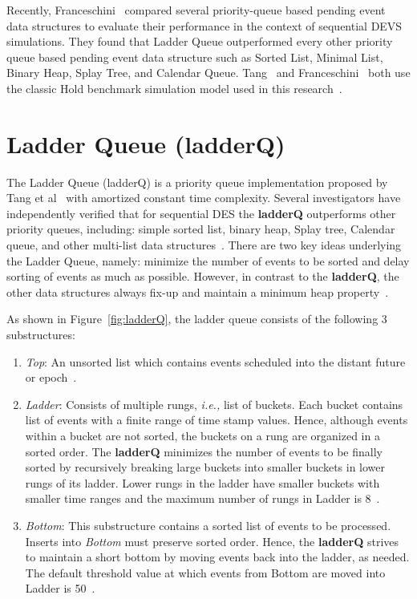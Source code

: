 Recently, Franceschini~\cite{franceschini-15} compared several
priority-queue based pending event data structures to evaluate their
performance in the context of sequential DEVS simulations. They found
that Ladder Queue outperformed every other priority queue based
pending event data structure such as Sorted List, Minimal List, Binary
Heap, Splay Tree, and Calendar Queue. Tang~\cite{tang-05} and
Franceschini~\cite{franceschini-15} both use the classic Hold
benchmark simulation model used in this research~\cite{higiro2017multi}.

\section{Ladder Queue (ladderQ)}\label{sec:ladderQ}

The Ladder Queue (ladderQ) is a priority queue implementation proposed
by Tang et al~\cite{tang-05} with amortized constant time complexity.
Several investigators have independently verified that for sequential
DES the \textbf{ladderQ} outperforms other priority queues, including:
simple sorted list, binary heap, Splay tree, Calendar queue, and other
multi-list data
structures~\cite{dickman-13,franceschini-15,tang-05}. There are two
key ideas underlying the Ladder Queue, namely: minimize the number of
events to be sorted and delay sorting of events as much as possible.
However, in contrast to the \textbf{ladderQ}, the other data
structures always fix-up and maintain a minimum heap property~\cite{higiro2017multi}.

As shown in Figure~\ref{fig:ladderQ}, the ladder queue consists of
the following 3 substructures:

\begin{enumerate}[leftmargin=*,topsep=0pt]

\item \emph{Top}: An unsorted list which contains events scheduled into the distant future or epoch~\cite{higiro2017multi}.

\item \emph{Ladder}: Consists of multiple rungs, \textit{i.e.,} list
  of buckets. Each bucket contains list of events with a finite range
  of time stamp values. Hence, although events within a bucket are not
  sorted, the buckets on a rung are organized in a sorted order. The
  \textbf{ladderQ} minimizes the number of events to be finally sorted
  by recursively breaking large buckets into smaller buckets in lower
  rungs of its ladder. Lower rungs in the ladder have smaller buckets
  with smaller time ranges and the maximum number of rungs in Ladder
  is 8~\cite{higiro2017multi}.

\item \emph{Bottom}: This substructure contains a sorted list of
  events to be processed. Inserts into \emph{Bottom} must preserve
  sorted order. Hence, the \textbf{ladderQ} strives to maintain a
  short bottom by moving events back into the ladder, as needed. The
  default threshold value at which events from Bottom are moved into
  Ladder is 50~\cite{tang-05,higiro2017multi}.

\end{enumerate}

